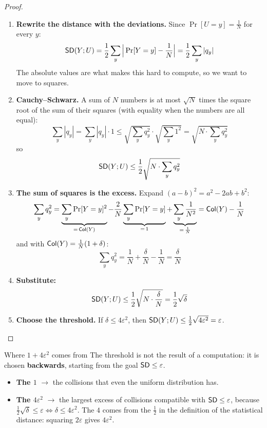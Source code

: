 \begin{proof}
  \leavevmode
  \begin{enumerate}
    \item \textbf{Rewrite the distance with the deviations.} Since $\Pr[U = y] = \frac{1}{N}$ for every $y$:
    \[
      \mathsf{SD}(Y; U) = \frac{1}{2}\sum_y \Big|\Pr[Y = y] - \frac{1}{N}\Big| = \frac{1}{2}\sum_y |q_y|
    \]
    The absolute values are what makes this hard to compute, so we want to move to squares.
    \item \textbf{Cauchy--Schwarz.} A sum of $N$ numbers is at most $\sqrt{N}$ times the square root of the sum of their squares (with equality when the numbers are all equal):
    \[
      \sum_y |q_y| = \sum_y |q_y| \cdot 1 \leq \sqrt{\sum_y q_y^2} \cdot \sqrt{\sum_y 1^2} = \sqrt{N \cdot \sum_y q_y^2}
    \]
    so
    \[
      \mathsf{SD}(Y; U) \leq \frac{1}{2}\sqrt{N \cdot \sum_y q_y^2}
    \]
    \item \textbf{The sum of squares is the excess.} Expand $(a - b)^2 = a^2 - 2ab + b^2$:
    \[
      \sum_y q_y^2 = \underbrace{\sum_y \Pr[Y = y]^2}_{=\,\mathsf{Col}(Y)} - \frac{2}{N}\underbrace{\sum_y \Pr[Y = y]}_{=\,1} + \underbrace{\sum_y \frac{1}{N^2}}_{=\,\frac{1}{N}} = \mathsf{Col}(Y) - \frac{1}{N}
    \]
    and with $\mathsf{Col}(Y) = \frac{1}{N}(1 + \delta)$:
    \[
      \sum_y q_y^2 = \frac{1}{N} + \frac{\delta}{N} - \frac{1}{N} = \frac{\delta}{N}
    \]
    \item \textbf{Substitute:}
    \[
      \mathsf{SD}(Y; U) \leq \frac{1}{2}\sqrt{N \cdot \frac{\delta}{N}} = \frac{1}{2}\sqrt{\delta}
    \]
    \item \textbf{Choose the threshold.} If $\delta \leq 4\varepsilon^2$, then $\mathsf{SD}(Y; U) \leq \frac{1}{2}\sqrt{4\varepsilon^2} = \varepsilon$. \qedhere
  \end{enumerate}
\end{proof}

\begin{framedobs}{Where $1 + 4\varepsilon^2$ comes from}
  The threshold is not the result of a computation: it is chosen \textbf{backwards}, starting from the goal $\mathsf{SD} \leq \varepsilon$.
  \begin{itemize}
    \item \textbf{The $1$} $\to$ the collisions that even the uniform distribution has.
    \item \textbf{The $4\varepsilon^2$} $\to$ the largest excess of collisions compatible with $\mathsf{SD} \leq \varepsilon$, because $\frac{1}{2}\sqrt{\delta} \leq \varepsilon \iff \delta \leq 4\varepsilon^2$. The $4$ comes from the $\frac{1}{2}$ in the definition of the statistical distance: squaring $2\varepsilon$ gives $4\varepsilon^2$.
  \end{itemize}
\end{framedobs}

